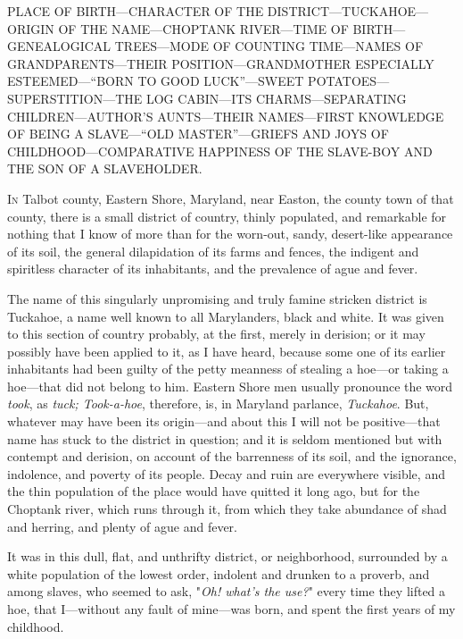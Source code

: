 {PLACE OF BIRTH---CHARACTER OF THE DISTRICT---TUCKAHOE---ORIGIN OF THE
NAME---CHOPTANK RIVER---TIME OF BIRTH---GENEALOGICAL TREES---MODE OF
COUNTING TIME---NAMES OF GRANDPARENTS---THEIR POSITION---GRANDMOTHER
ESPECIALLY ESTEEMED---``BORN TO GOOD LUCK''---SWEET
POTATOES---SUPERSTITION---THE LOG CABIN---ITS CHARMS---SEPARATING
CHILDREN---AUTHOR'S AUNTS---THEIR NAMES---FIRST KNOWLEDGE OF BEING A
SLAVE---``OLD MASTER''---GRIEFS AND JOYS OF CHILDHOOD---COMPARATIVE
HAPPINESS OF THE SLAVE-BOY AND THE SON OF A SLAVEHOLDER.}

\textsc{In} Talbot county, Eastern Shore, Maryland, near Easton, the
county town of that county, there is a small district of country, thinly
populated, and remarkable for nothing that I know of more than for the
worn-out, sandy, desert-like appearance of its soil, the general
dilapidation of its farms and fences, the indigent and spiritless
character of its inhabitants, and the prevalence of ague and fever.

The name of this singularly unpromising and truly famine stricken
district is Tuckahoe, a name well known to all Marylanders, black and
white. It was given to this section of country probably, at the first,
merely in derision; or it may possibly have been
{\protect\hypertarget{34}{}{}}applied to it, as I have heard, because
some one of its earlier inhabitants had been guilty of the petty
meanness of stealing a hoe---or taking a hoe---that did not belong to
him. Eastern Shore men usually pronounce the word \emph{took}, as
\emph{tuck; Took-a-hoe}, therefore, is, in Maryland parlance,
\emph{Tuckahoe}. But, whatever may have been its origin---and about this
I will not be positive---that name has stuck to the district in
question; and it is seldom mentioned but with contempt and derision, on
account of the barrenness of its soil, and the ignorance, indolence, and
poverty of its people. Decay and ruin are everywhere visible, and the
thin population of the place would have quitted it long ago, but for the
Choptank river, which runs through it, from which they take abundance of
shad and herring, and plenty of ague and fever.

It was in this dull, flat, and unthrifty district, or neighborhood,
surrounded by a white population of the lowest order, indolent and
drunken to a proverb, and among slaves, who seemed to ask, "\emph{Oh!
what's the use?}" every time they lifted a hoe, that I---without any
fault of mine---was born, and spent the first years of my childhood.

